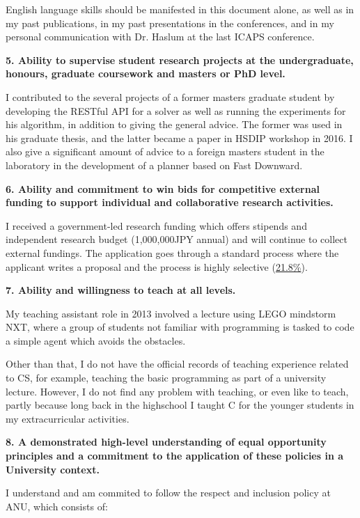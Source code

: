\documentclass[12pt]{article}
\begin{document}
English language skills should be manifested in this document alone, as
well as in my past publications, in my past presentations in the conferences,
and in my personal communication with Dr. Haslum at the last ICAPS conference.

\textbf{5. Ability to supervise student research projects at the
undergraduate, honours, graduate coursework and masters or PhD level.}

I contributed to the several projects of a former masters graduate student
by developing the RESTful API for a solver as well as running the
experiments for his algorithm, in addition to giving the general advice.
The former was used in his graduate thesis,
and the latter became a paper in HSDIP workshop in 2016.
I also give a significant amount of advice to a foreign masters student in the laboratory
in the development of a planner based on Fast Downward.

\textbf{6. Ability and commitment to win bids for competitive external
funding to support individual and collaborative research activities.}

I received a government-led research funding which offers
stipends and independent research budget (1,000,000JPY annual) and will continue to collect external fundings.
The application goes through a standard process where the applicant writes 
a proposal and the process is highly selective (\href{https://www.jsps.go.jp/j-pd/pd_saiyo.html}{21.8\%}).

\textbf{7. Ability and willingness to teach at all levels.}

My teaching assistant role in 2013 involved a lecture using LEGO mindstorm NXT,
where a group of students not familiar with programming is tasked to code a simple
agent which avoids the obstacles.

Other than that, I do not have the official records of
teaching experience related to CS, for example, teaching the basic programming as part of a university lecture.
However, I do not find any problem with teaching, or even like to teach,
partly because long back in the highschool I taught C for the younger students in my extracurricular activities.


\textbf{8. A demonstrated high-level understanding of equal opportunity
principles and a commitment to the application of these policies in a
University context.}

I understand and am commited to follow the respect and inclusion policy at ANU, which consists of:
\end{document}

